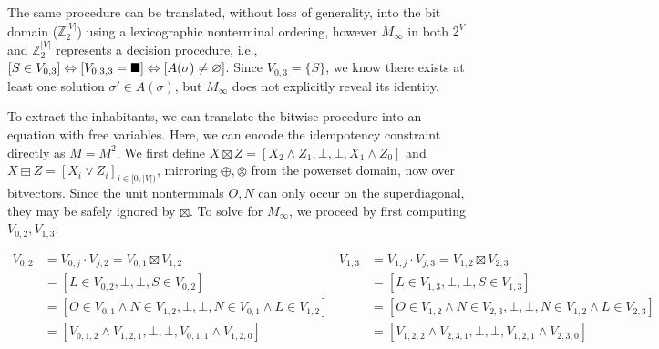 \documentclass[sigplan,acmsmall,nonacm,screen]{acmart}\settopmatter{printfolios=false,printccs=false,printacmref=false}
\begin{document}
  \vspace{8pt}The same procedure can be translated, without loss of generality, into the bit domain ($\mathbb{Z}_2^{|V|}$) using a lexicographic nonterminal ordering, however $M_\infty$ in both $2^V$ and $\mathbb{Z}_2^{|V|}$ represents a decision procedure, i.e., $[S\in V_{0, 3}]\Leftrightarrow [V_{0, 3, 3}=\blacksquare] \Leftrightarrow [A(\sigma) \neq \varnothing]$. Since $V_{0, 3} = \{S\}$, we know there exists at least one solution $\sigma' \in A(\sigma)$, but $M_\infty$ does not explicitly reveal its identity.


  To extract the inhabitants, we can translate the bitwise procedure into an equation with free variables. Here, we can encode the idempotency constraint directly as $M = M^2$. We first define $X \boxtimes Z = [X_2 \land Z_1, \bot, \bot, X_1 \land Z_0]$ and $X \boxplus Z = [X_i \lor Z_i]_{i \in [0, |V|)}$, mirroring $\oplus, \otimes$ from the powerset domain, now over bitvectors. Since the unit nonterminals $O, N$ can only occur on the superdiagonal, they may be safely ignored by $\boxtimes$. To solve for $M_\infty$, we proceed by first computing $V_{0, 2}, V_{1, 3}$:\vspace{-8pt}

  \begin{small}
  \begin{align*}
    V_{0, 2} &= V_{0, j} \cdot V_{j, 2} = V_{0, 1} \boxtimes V_{1, 2}                         &  V_{1, 3} &= V_{1, j} \cdot V_{j, 3} = V_{1, 2} \boxtimes V_{2, 3}\\
    &= [L \in V_{0, 2}, \bot, \bot, S \in V_{0, 2}]                                           &  &= [L \in V_{1, 3}, \bot, \bot, S \in V_{1, 3}]\\
    &= [O \in V_{0, 1} \land N \in V_{1, 2}, \bot, \bot, N \in V_{0, 1} \land L \in V_{1, 2}] &  &= [O \in V_{1, 2} \land N \in V_{2, 3}, \bot, \bot, N \in V_{1, 2} \land L \in V_{2, 3}]\\
    &= [V_{0, 1, 2} \land V_{1, 2, 1}, \bot, \bot, V_{0, 1, 1} \land V_{1, 2, 0}]             &  &= [V_{1, 2, 2} \land V_{2, 3, 1}, \bot, \bot, V_{1, 2, 1} \land V_{2, 3, 0}]
  \end{align*}
  \end{small}\vspace{-8pt}
\end{document}
